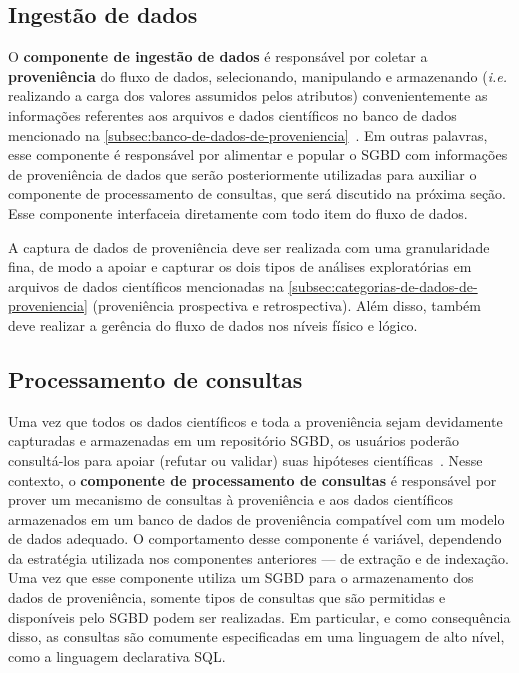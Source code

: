 \subsection{Ingestão de dados}

O \textbf{componente de ingestão de dados} é responsável por coletar a \textbf{proveniência} do fluxo de dados, selecionando, manipulando e armazenando (\textit{i.e.} realizando a carga dos valores assumidos pelos atributos) convenientemente as informações referentes aos arquivos e dados científicos no banco de dados mencionado na \autoref{subsec:banco-de-dados-de-proveniencia}~\cite{silva2015propostadoutorado}. Em outras palavras, esse componente é responsável por alimentar e popular o SGBD com informações de proveniência de dados que serão posteriormente utilizadas para auxiliar o componente de processamento de consultas, que será discutido na próxima seção. Esse componente interfaceia diretamente com todo item do fluxo de dados.

A captura de dados de proveniência deve ser realizada com uma granularidade fina, de modo a apoiar e capturar os dois tipos de análises exploratórias em arquivos de dados científicos mencionadas na \autoref{subsec:categorias-de-dados-de-proveniencia} (proveniência prospectiva e retrospectiva). Além disso, também deve realizar a gerência do fluxo de dados nos níveis físico e lógico.

\subsection{Processamento de consultas}

Uma vez que todos os dados científicos e toda a proveniência sejam devidamente capturadas e armazenadas em um repositório SGBD, os usuários poderão consultá-los para apoiar (refutar ou validar) suas hipóteses científicas~\cite{silva2015propostadoutorado}. Nesse contexto, o \textbf{componente de processamento de consultas} é responsável por prover um mecanismo de consultas à proveniência e aos dados científicos armazenados em um banco de dados de proveniência compatível com um modelo de dados adequado. O comportamento desse componente é variável, dependendo da estratégia utilizada nos componentes anteriores --- de extração e de indexação. Uma vez que esse componente utiliza um SGBD para o armazenamento dos dados de proveniência, somente tipos de consultas que são permitidas e disponíveis pelo SGBD podem ser realizadas. Em particular, e como consequência disso, as consultas são comumente especificadas em uma linguagem de alto nível, como a linguagem declarativa SQL.

